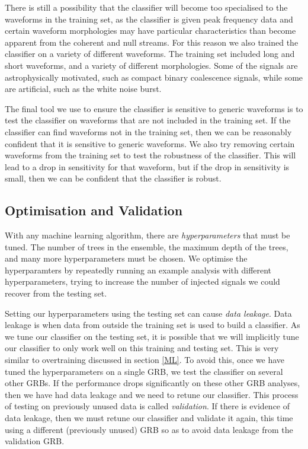 \documentclass[11pt]{cuthesis}
\begin{document}
There is still a possibility that the classifier will become too specialised to the waveforms in the training set, as the classifier is given peak frequency data and certain waveform morphologies may have particular characteristics than become apparent from the coherent and null streams. For this reason we also trained the classifier on a variety of different waveforms. The training set included long and short waveforms, and a variety of different morphologies. Some of the signals are astrophysically motivated, such as compact binary coalescence signals, while some are artificial, such as the white noise burst.

The final tool we use to ensure the classifier is sensitive to generic waveforms is to test the classifier on waveforms that are not included in the training set. If the classifier can find waveforms not in the training set, then we can be reasonably confident that it is sensitive to generic waveforms. We also try removing certain waveforms from the training set to test the robustness of the classifier. This will lead to a drop in sensitivity for that waveform, but if the drop in sensitivity is small, then we can be confident that the classifier is robust. 

\subsection{Optimisation and Validation} \label{opt}
With any machine learning algorithm, there are \textit{hyperparameters} that must be tuned. The number of trees in the ensemble, the maximum depth of the trees, and many more hyperparameters must be chosen. We optimise the hyperparamters by repeatedly running an example analysis with different hyperparameters, trying to increase the number of injected signals we could recover from the testing set. 

Setting our hyperparameters using the testing set can cause \textit{data leakage}. Data leakage is when data from outside the training set is used to build a classifier. As we tune our classifier on the testing set, it is possible that we will implicitly tune our classifier to only work well on this training and testing set. This is very similar to overtraining discussed in section \ref{ML}. To avoid this, once we have tuned the hyperparameters on a single GRB, we test the classifier on several other GRBs. If the performance drops significantly on these other GRB analyses, then we have had data leakage and we need to retune our classifier. This process of testing on previously unused data is called \textit{validation}. If there is evidence of data leakage, then we must retune our classifier and validate it again, this time using a different (previously unused) GRB so as to avoid data leakage from the validation GRB. 
\end{document}
